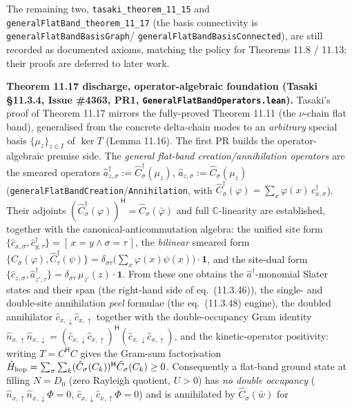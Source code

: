 \documentclass[a4paper,11pt]{article}
\begin{document}
The remaining two, \texttt{tasaki\_theorem\_11\_15} and \texttt{generalFlatBand\_theorem\_11\_17}
(the basis connectivity is \texttt{generalFlatBandBasisGraph}/%
\texttt{generalFlatBandBasisConnected}), are still recorded as documented axioms, matching the
policy for Theorems 11.8 / 11.13; their proofs are deferred to later work.

\medskip\noindent\textbf{Theorem 11.17 discharge, operator-algebraic foundation (Tasaki
§11.3.4, Issue \#4363, PR1, \texttt{GeneralFlatBandOperators.lean}).}  Tasaki's proof of
Theorem 11.17 mirrors the fully-proved Theorem 11.11 (the $\nu$-chain flat band), generalised
from the concrete delta-chain modes to an \emph{arbitrary} special basis $\{\mu_z\}_{z\in I}$ of
$\ker T$ (Lemma 11.16).  The first PR builds the operator-algebraic premise side.  The
\emph{general flat-band creation/annihilation operators} are the smeared operators
$\hat a^\dagger_{z,\sigma} := \hat C^\dagger_\sigma(\mu_z)$,
$\hat a_{z,\sigma} := \hat C_\sigma(\mu_z)$
(\texttt{generalFlatBandCreation}/\texttt{Annihilation}, with
$\hat C^\dagger_\sigma(\varphi)=\sum_x \varphi(x)\,\hat c^\dagger_{x,\sigma}$).  Their adjoints
$(\hat C^\dagger_\sigma(\varphi))^{\mathsf H}=\hat C_\sigma(\bar\varphi)$ and full
$\mathbb C$-linearity are established, together with the canonical-anticommutation algebra: the
unified site form $\{\hat c_{x,\sigma},\hat c^\dagger_{y,\tau}\}=[\,x{=}y\wedge
\sigma{=}\tau\,]$, the \emph{bilinear} smeared form $\{\hat C_\sigma(\varphi),
\hat C^\dagger_\tau(\psi)\}=\delta_{\sigma\tau}\bigl(\sum_x\varphi(x)\psi(x)\bigr)\cdot\mathbf 1$,
and the site-dual form $\{\hat c_{z,\sigma},\hat a^\dagger_{z',\tau}\}=\delta_{\sigma\tau}\,
\mu_{z'}(z)\cdot\mathbf 1$.  From these one obtains the $\hat a^\dagger$-monomial Slater states and
their span (the right-hand side of eq.~(11.3.46)), the single- and double-site annihilation
\emph{peel} formulae (the eq.~(11.3.48) engine), the doubled annihilator
$\hat c_{x,\downarrow}\hat c_{x,\uparrow}$ together with the double-occupancy Gram identity
$\hat n_{x,\uparrow}\hat n_{x,\downarrow}=(\hat c_{x,\downarrow}\hat c_{x,\uparrow})^{\mathsf H}
(\hat c_{x,\downarrow}\hat c_{x,\uparrow})$, and the kinetic-operator positivity: writing
$T=C^{\mathsf H}C$ gives the Gram-sum factorisation
$\hat H_{\rm hop}=\sum_\sigma\sum_k (\hat C_\sigma(C_k))^{\mathsf H}\hat C_\sigma(C_k)\ge0$.
Consequently a flat-band ground state at filling $N=D_0$ (zero Rayleigh quotient, $U>0$) has
\emph{no double occupancy} ($\hat n_{x,\uparrow}\hat n_{x,\downarrow}\Phi=0$,
$\hat c_{x,\downarrow}\hat c_{x,\uparrow}\Phi=0$) and is annihilated by $\hat C_\sigma(\bar w)$ for
\end{document}
